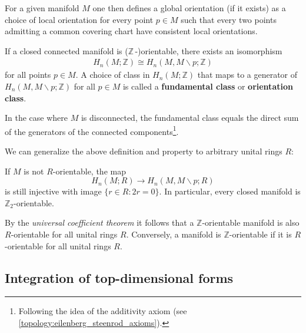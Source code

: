     For a given manifold $M$ one then defines a global orientation (if it exists) as a choice of local orientation for every point $p\in M$ such that every two points admitting a common covering chart have consistent local orientations.

    \begin{property}[Orientability]\label{diff:orientation_class}
        If a closed connected manifold is ($\mathbb{Z}\,$-)orientable, there exists an isomorphism
        \begin{gather}
            H_n(M;\mathbb{Z})\cong H_n(M, M\backslash p;\mathbb{Z})
        \end{gather}
        for all points $p\in M$. A choice of class in $H_n(M;\mathbb{Z})$ that maps to a generator of $H_n(M, M\backslash p;\mathbb{Z})$ for all $p\in M$ is called a \textbf{fundamental class} or \textbf{orientation class}.

        In the case where $M$ is disconnected, the fundamental class equals the direct sum of the generators of the connected components\footnote{Following the idea of the additivity axiom (see \ref{topology:eilenberg_steenrod_axioms}).}.
    \end{property}
    We can generalize the above definition and property to arbitrary unital rings $R$:

    \begin{property}
        If $M$ is not $R$-orientable, the map \[H_n(M;R)\rightarrow H_n(M, M\backslash p;R)\] is still injective with image $\{r\in R:2r=0\}$. In particular, every closed manifold is $\mathbb{Z}_2$-orientable.
    \end{property}

    \begin{property}
        By the \textit{universal coefficient theorem} it follows that a $\mathbb{Z}$-orientable manifold is also $R$-orientable for all unital rings $R$. Conversely, a manifold is $\mathbb{Z}$-orientable if it is $R$-orientable for all unital rings $R$.
    \end{property}

\subsection{Integration of top-dimensional forms}

